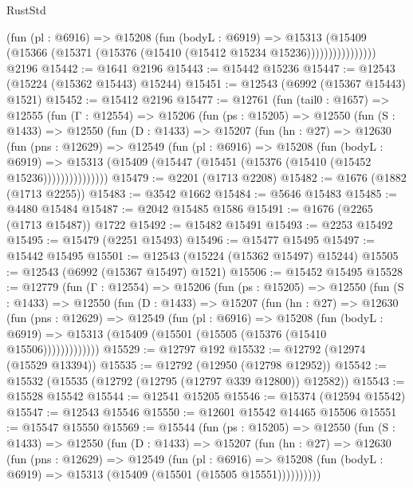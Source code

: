 \begin{lexlean}{RustStd}
\begin{coremodule}
                    (fun (pl : @6916) =>
                    @15208
                      (fun (bodyL : @6919) =>
                      @15313
                        (@15409
                          (@15366 (@15371 (@15376 (@15410 (@15412 @15234 @15236))))))))))))))))
    @2196
@15442 := @1641 @2196
@15443 := @15442 @15236
@15447 := @12543 (@15224 (@15362 @15443) @15244)
@15451 := @12543 (@6992 (@15367 @15443) @1521)
@15452 := @15412 @2196
@15477 := @12761
    (fun (tail0 : @1657) =>
    @12555
      (fun (Γ : @12554) =>
      @15206
        (fun (ps : @15205) =>
        @12550
          (fun (S : @1433) =>
          @12550
            (fun (D : @1433) =>
            @15207
              (fun (hn : @27) =>
              @12630
                (fun (pns : @12629) =>
                @12549
                  (fun (pl : @6916) =>
                  @15208
                    (fun (bodyL : @6919) =>
                    @15313 (@15409 (@15447 (@15451 (@15376 (@15410 (@15452 @15236)))))))))))))))
@15479 := @2201 (@1713 @2208)
@15482 := @1676 (@1882 (@1713 @2255))
@15483 := @3542 @1662
@15484 := @5646 @15483
@15485 := @4480 @15484
@15487 := @2042 @15485 @1586
@15491 := @1676 (@2265 (@1713 @15487)) @1722
@15492 := @15482 @15491
@15493 := @2253 @15492
@15495 := @15479 (@2251 @15493)
@15496 := @15477 @15495
@15497 := @15442 @15495
@15501 := @12543 (@15224 (@15362 @15497) @15244)
@15505 := @12543 (@6992 (@15367 @15497) @1521)
@15506 := @15452 @15495
@15528 := @12779
    (fun (Γ : @12554) =>
    @15206
      (fun (ps : @15205) =>
      @12550
        (fun (S : @1433) =>
        @12550
          (fun (D : @1433) =>
          @15207
            (fun (hn : @27) =>
            @12630
              (fun (pns : @12629) =>
              @12549
                (fun (pl : @6916) =>
                @15208
                  (fun (bodyL : @6919) =>
                  @15313 (@15409 (@15501 (@15505 (@15376 (@15410 @15506)))))))))))))
@15529 := @12797 @192
@15532 := @12792 (@12974 (@15529 @13394))
@15535 := @12792 (@12950 (@12798 @12952))
@15542 := @15532 (@15535 (@12792 (@12795 (@12797 @339 @12800)) @12582))
@15543 := @15528 @15542
@15544 := @12541 @15205
@15546 := @15374 (@12594 @15542)
@15547 := @12543 @15546
@15550 := @12601 @15542 @14465 @15506
@15551 := @15547 @15550
@15569 := @15544
    (fun (ps : @15205) =>
    @12550
      (fun (S : @1433) =>
      @12550
        (fun (D : @1433) =>
        @15207
          (fun (hn : @27) =>
          @12630
            (fun (pns : @12629) =>
            @12549
              (fun (pl : @6916) =>
              @15208 (fun (bodyL : @6919) => @15313 (@15409 (@15501 (@15505 @15551))))))))))

\end{coremodule}
\end{lexlean}
